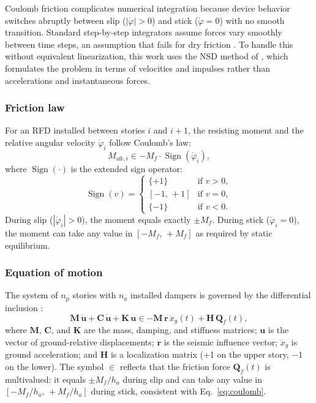 \documentclass[preprint,12pt,authoryear]{elsarticle}
\newcommand{\np}{n_{\mathrm{p}}}              %
\newcommand{\Mf}{M_{\!f}}
\newcommand{\ha}{h_a}
\begin{document}
Coulomb friction complicates numerical integration because device behavior switches
abruptly between slip ($|\dot{\varphi}|>0$) and stick ($\dot{\varphi}=0$) with no
smooth transition. Standard step-by-step integrators assume forces vary smoothly
between time steps, an assumption that fails for dry friction
\citep{chopra_dynamics_2015}. To handle this without equivalent linearization, this
work uses the NSD method of \citet{Namorado2024}, which formulates the problem in
terms of velocities and impulses rather than accelerations and instantaneous forces.

\subsubsection*{Friction law}

For an RFD installed between stories $i$ and $i+1$, the resisting moment and the
relative angular velocity $\dot{\varphi}_i$ follow Coulomb's law:
\begin{equation}
    M_{\mathrm{afr},i} \in -\Mf \cdot \operatorname{Sign}\!\left(\dot{\varphi}_i\right),
    \label{eq:coulomb}
\end{equation}
where $\operatorname{Sign}(\cdot)$ is the extended sign operator:
\begin{equation}
    \operatorname{Sign}(v) =
    \begin{cases}
        \{+1\}    & \text{if } v > 0, \\
        [-1,\,+1] & \text{if } v = 0, \\
        \{-1\}    & \text{if } v < 0.
    \end{cases}
    \label{eq:sign}
\end{equation}
During slip ($|\dot{\varphi}_i|>0$), the moment equals exactly $\pm\Mf$. During
stick ($\dot{\varphi}_i=0$), the moment can take any value in $[-\Mf,\,+\Mf]$ as
required by static equilibrium.

\subsubsection*{Equation of motion}

The system of $\np$ stories with $n_a$ installed dampers is governed by the
differential inclusion \citep{Namorado2024}:
\begin{equation}
    \bm{M}\,\ddot{\bm{u}} + \bm{C}\,\dot{\bm{u}} + \bm{K}\,\bm{u}
    \in -\bm{M}\,\bm{r}\,\ddot{x}_g(t) + \bm{H}\,\bm{Q}_f(t),
    \label{eq:eom}
\end{equation}
where $\bm{M}$, $\bm{C}$, and $\bm{K}$ are the mass, damping, and stiffness
matrices; $\bm{u}$ is the vector of ground-relative displacements; $\bm{r}$ is the
seismic influence vector; $\ddot{x}_g$ is ground acceleration; and $\bm{H}$ is a
localization matrix (+1 on the upper story, $-1$ on the lower). The symbol $\in$
reflects that the friction force $\bm{Q}_f(t)$ is multivalued: it equals
$\pm\Mf/\ha$ during slip and can take any value in $[-\Mf/\ha,\,+\Mf/\ha]$ during
stick, consistent with Eq.~\ref{eq:coulomb}.
\end{document}
